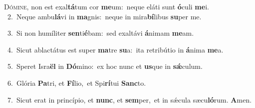 \lettrine{\initial\textcolor{\initialcolor}{D}}{ómine,} non est exal\-\textbf{tá}\-tum cor \textbf{me}\-um:~\star neque eláti sunt \textbf{ó}\-culi \textbf{me}\-i.\\
{\numbfont\textcolor{\numbcolor}{~2.}}~Neque ambu\-\textbf{lá}\-vi in \textbf{ma}\-gnis:~\star neque in mira\-\textbf{bí}\-libus \textbf{su}\-per me.\par
{\numbfont\textcolor{\numbcolor}{~3.}}~Si non humíliter \textbf{sen}\-ti\-\textbf{é}\-bam:~\star sed exaltávi \textbf{á}\-nimam \textbf{me}\-am.\par
{\numbfont\textcolor{\numbcolor}{~4.}}~Sicut ablactátus est super \textbf{ma}\-tre \textbf{su}\-a:~\star ita retribútio in \textbf{á}\-nima \textbf{me}\-a.\par
{\numbfont\textcolor{\numbcolor}{~5.}}~Speret Isra\textbf{ël} in \textbf{Dó}\-mino:~\star ex hoc nunc et \textbf{us}\-que in \textbf{sǽ}\-culum.\par
{\numbfont\textcolor{\numbcolor}{~6.}}~Glória \textbf{Pa}\-tri, et \textbf{Fí}\-lio,~\star et Spi\-\textbf{rí}\-tui \textbf{Sanc}\-to.\par
{\numbfont\textcolor{\numbcolor}{~7.}}~Sicut erat in princípio, et \textbf{nunc}\-, et \textbf{sem}\-per,~\star et in sǽcula sæcu\-\textbf{ló}\-rum. \textbf{A}\-men.\par
